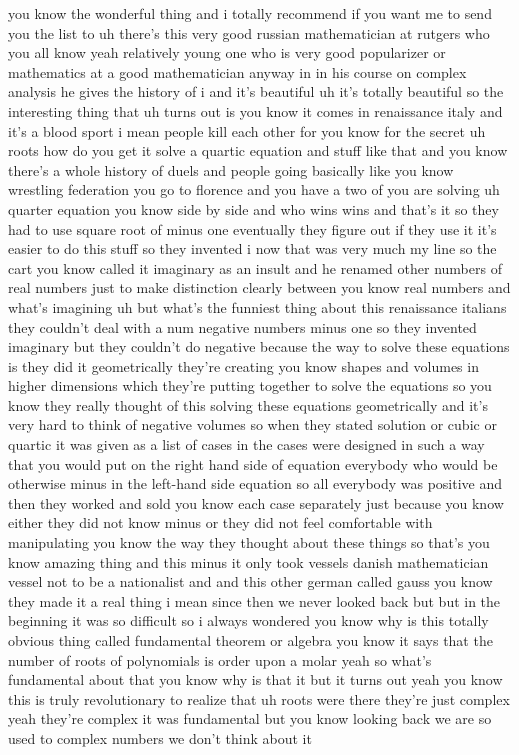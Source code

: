 \begin{description}
you know the wonderful thing and i totally recommend if you want me to send you the list to uh there's this very good russian mathematician at rutgers who you all know yeah relatively young one who is very good popularizer or mathematics at a good mathematician anyway in in his course on complex analysis he gives the history of i and it's beautiful uh it's totally beautiful so the interesting thing that uh turns out is you know it comes in renaissance italy and it's a blood sport i mean people kill each other for you know for the secret uh roots how do you get it solve a quartic equation and stuff like that and you know there's a whole history of duels and people going basically like you know wrestling federation you go to florence and you have a two of you are solving uh quarter equation you know side by side and who wins wins and that's it so they had to use square root of minus one eventually they figure out if they use it it's easier to do this stuff so they invented i now that was very much my line so the cart you know called it imaginary as an insult and he renamed other numbers of real numbers just to make distinction clearly between you know real numbers and what's imagining uh but what's the funniest thing about this renaissance italians they couldn't deal with a num negative numbers minus one so they invented imaginary but they couldn't do negative because the way to solve these equations is they did it geometrically they're creating you know shapes and volumes in higher dimensions which they're putting together to solve the equations so you know they really thought of this solving these equations geometrically and it's very hard to think of negative volumes so when they stated solution or cubic or quartic it was given as a list of cases in the cases were designed in such a way that you would put on the right hand side of equation everybody who would be otherwise minus in the left-hand side equation so all everybody was positive and then they worked and sold you know each case separately just because you know either they did not know minus or they did not feel comfortable with manipulating you know the way they thought about these things so that's you know amazing thing and this minus it only took vessels danish mathematician vessel not to be a nationalist and and this other german called gauss you know they made it a real thing i mean since then we never looked back but but in the beginning it was so difficult so i always wondered you know why is this totally obvious thing called fundamental theorem or algebra you know it says that the number of roots of polynomials is order upon a molar yeah so what's fundamental about that you know why is that it but it turns out yeah you know this is truly revolutionary to realize that uh roots were there they're just complex yeah they're complex it was fundamental but you know looking back we are so used to complex numbers we don't think about it


\end{description}
